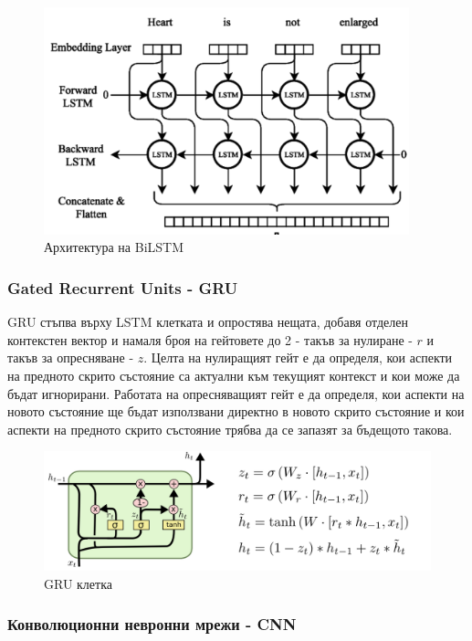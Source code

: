 \documentclass{article}
\begin{document}
\begin{figure}[H]
    \centering
    \captionsetup{justification=centering}
    \includegraphics[width=400px, keepaspectratio]{chapter-03/bi-lstm.png}
    \caption{Архитектура на BiLSTM}
\end{figure}

\subsubsection{Gated Recurrent Units - GRU}

GRU стъпва върху LSTM клетката и опростява нещата, добавя отделен контекстен вектор и намаля броя на гейтовете до 2 -
такъв за нулиране - $r$ и такъв за опресняване - $z$. Целта на нулиращият гейт е да определя, кои аспекти на предното
скрито състояние са актуални към текущият контекст и кои може да бъдат игнорирани. Работата на опресняващият гейт е да
определя, кои аспекти на новото състояние ще бъдат използвани директно в новото скрито състояние и кои аспекти на
предното скрито състояние трябва да се запазят за бъдещото такова. \cite{intro-to-nlp-stanford}

\begin{figure}[H]
  \centering
  \captionsetup{justification=centering}
  \includegraphics[width=450px, keepaspectratio]{chapter-03/gru.png}
  \caption{GRU клетка}
\end{figure}

\subsubsection{Конволюционни невронни мрежи - CNN}
\end{document}
